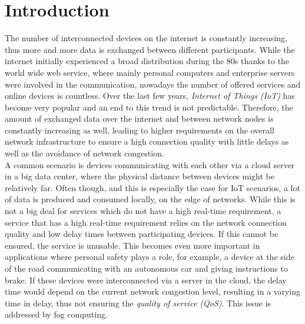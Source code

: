 \chapter{Introduction\label{cha:chapter1}}

The number of interconnected devices on the internet is constantly increasing, thus more and more data is exchanged between different participants.
While the internet initially experienced a broad distribution during the 80s thanks to the world wide web service, where mainly personal computers and enterprise servers were involved in the communication, nowadays the number of offered services and online devices is countless.
Over the last few years, \textit{Internet of Things (IoT)} has become very popular and an end to this trend is not predictable.
Therefore, the amount of exchanged data over the internet and between network nodes is constantly increasing as well, leading to higher requirements on the overall network infrastructure to ensure a high connection quality with little delays as well as the avoidance of network congestion.\\

A common scenario is devices communicating with each other via a cloud server in a big data center, where the physical distance between devices might be relatively far.
Often though, and this is especially the case for IoT scenarios, a lot of data is produced and consumed locally, on the edge of networks.
While this is not a big deal for services which do not have a high real-time requirement, a service that has a high real-time requirement relies on the network connection quality and low delay times between participating devices.
If this cannot be ensured, the service is unusable.
This becomes even more important in applications where personal safety plays a role, for example, a device at the side of the road communicating with an autonomous car and giving instructions to brake.
If these devices were interconnected via a server in the cloud, the delay time would depend on the current network congestion level, resulting in a varying time in delay, thus not ensuring the \textit{quality of service (QoS)}.
This issue is addressed by fog computing.\\

